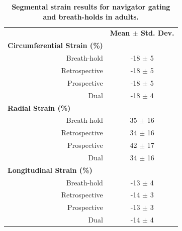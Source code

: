 	\begin{table}
		\centering
		\caption[Segmental strain results for navigator gating and breath-holds in adults]{\textbf{Segmental strain results for navigator gating and breath-holds in adults.}}
		\label{table:navigator_segmental_strains}
		\begin{tabular}{c  c}
			\toprule
			\multicolumn{1}{c}{}       			 & \multicolumn{1}{c}{\textbf{Mean $\pm$ Std. Dev.}} \\ 
			\multicolumn{1}{l}{\textbf{Circumferential Strain (\%)}} & \multicolumn{1}{c}{}          \\
			\multicolumn{1}{r}{Breath-hold}      & \multicolumn{1}{c}{-18 $\pm$ 5}                   \\
			\multicolumn{1}{r}{Retrospective}    & \multicolumn{1}{c}{-18 $\pm$ 5}                   \\
			\multicolumn{1}{r}{Prospective}      & \multicolumn{1}{c}{-18 $\pm$ 5}                   \\
			\multicolumn{1}{r}{Dual}    		 & \multicolumn{1}{c}{-18 $\pm$ 4}                   \\
			\multicolumn{1}{l}{\textbf{Radial Strain (\%)}}          & \multicolumn{1}{c}{}        	 \\
			\multicolumn{1}{r}{Breath-hold}      & \multicolumn{1}{c}{35 $\pm$ 16}                   \\
			\multicolumn{1}{r}{Retrospective}    & \multicolumn{1}{c}{34 $\pm$ 16}                   \\
			\multicolumn{1}{r}{Prospective}      & \multicolumn{1}{c}{42 $\pm$ 17}                   \\
			\multicolumn{1}{r}{Dual}		     & \multicolumn{1}{c}{34 $\pm$ 16}                   \\
			\multicolumn{1}{l}{\textbf{Longitudinal Strain (\%)}}    & \multicolumn{1}{c}{}          \\
			\multicolumn{1}{r}{Breath-hold}      & \multicolumn{1}{c}{-13 $\pm$ 4}                   \\
			\multicolumn{1}{r}{Retrospective}    & \multicolumn{1}{c}{-14 $\pm$ 3}                   \\
			\multicolumn{1}{r}{Prospective}      & \multicolumn{1}{c}{-13 $\pm$ 3}                   \\
			\multicolumn{1}{r}{Dual}		     & \multicolumn{1}{c}{-14 $\pm$ 4}            		 \\
			\bottomrule                                                 
		\end{tabular}
	\end{table}
	
